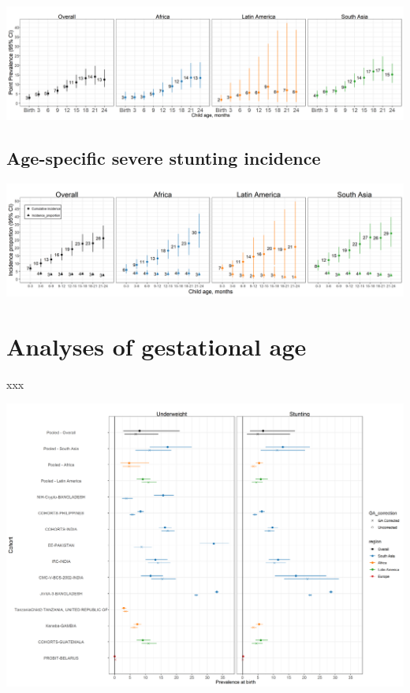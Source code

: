\documentclass[9pt,]{book}
\begin{document}
\includegraphics[width=58.33in]{figure-copies/fig-stunt-3-prev-overall_region--allage-primary}

\hypertarget{age-specific-severe-stunting-incidence}{%
\section{Age-specific severe stunting incidence}\label{age-specific-severe-stunting-incidence}}

\includegraphics[width=58.33in]{figure-copies/fig-stunt-3-inc-overall_region--allage-primary}

\hypertarget{gestational}{%
\chapter{Analyses of gestational age}\label{gestational}}

\raggedright

xxx

\includegraphics[width=58.33in]{figure-copies/fig-GA-correction-sensitivity}
\end{document}
